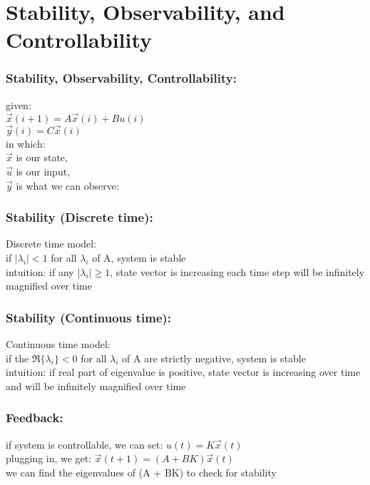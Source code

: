 \section{Stability, Observability, and Controllability}

\begin{frame}
\frametitle{Stability, Observability, Controllability:}

given: \\ 
$\vec{x}(i+1) = A\vec{x}(i) + Bu(i)$ \\
$\vec{y}(i) = C\vec{x}(i)$ \\
in which: \\
$\vec{x}$ is our state, \\
$\vec{u}$ is our input, \\
$\vec{y}$ is what we can observe: \\
\end{frame}

\begin{frame}
\frametitle{Stability (Discrete time):}

Discrete time model: \\
if $|\lambda_{i}| < 1$ for all $\lambda_{i}$ of A, system is stable\\
intuition: if any $|\lambda_{i}| \geqslant 1$, state vector is increasing each time step will be infinitely magnified over time \\
\end{frame}

\begin{frame}
\frametitle{Stability (Continuous time):}

Continuous time model: \\
if the \(\Re\{\lambda_{i}\} < 0\) for all \(\lambda_{i}\) of A are strictly negative, system is stable\\
intuition: if real part of eigenvalue is positive, state vector is increasing over time and will be infinitely magnified over time \\
\end{frame}



\begin{frame}
\frametitle{Feedback:}

if system is controllable, we can set: 
$u(t) = K\vec{x}(t)$ \\
plugging in, we get: 
$\vec{x}(t+1) = (A + BK)\vec{x}(t)$ \\
we can find the eigenvalues of (A + BK) to check for stability
\end{frame}


